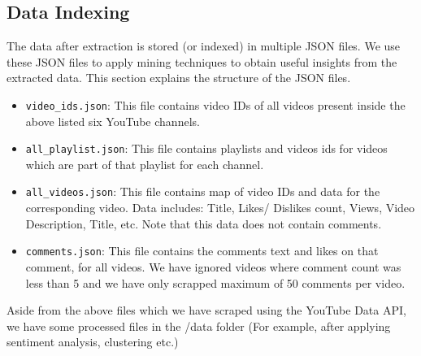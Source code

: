\documentclass{article}
\begin{document}
\subsection{Data Indexing}
The data after extraction is stored (or indexed) in multiple JSON files. We use these JSON files to apply mining techniques to obtain useful insights from the extracted data. This section explains the structure of the JSON files.
\begin{itemize}
    \item \texttt{video\_ids.json}: This file contains video IDs of all videos present inside the above listed six YouTube channels. 
    \item \texttt{all\_playlist.json}: This file contains playlists and videos ids for videos which are part of that playlist for each channel.
    \item \texttt{all\_videos.json}: This file contains map of video IDs and data for the corresponding video. Data includes: Title, Likes/ Dislikes count, Views, Video Description, Title, etc. Note that this data does not contain comments. 
    \item \texttt{comments.json}: This file contains the comments text and likes on that comment, for all videos. We have ignored videos where comment count was less than 5 and we have only scrapped maximum of 50 comments per video. 
\end{itemize}
Aside from the above files which we have scraped using the YouTube Data API, we have some processed files in the /data folder (For example, after applying sentiment analysis, clustering etc.) 

\end{document}
